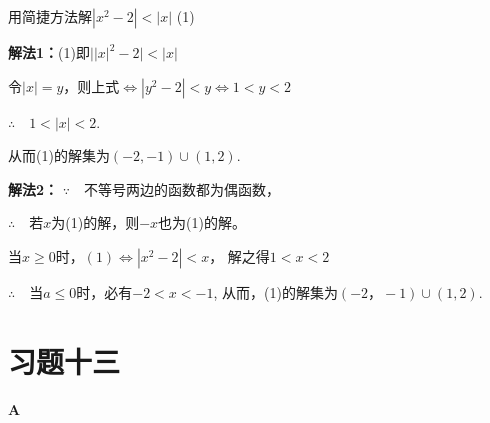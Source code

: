 \begin{example}
    用简捷方法解$|x^2-2|<|x|$ \hfill (1)
\end{example}

\begin{solution}
\textbf{解法1：}(1)即$\Big||x|^2-2\Big|<|x|$

令$|x|=y$，则上式$\Longleftrightarrow |y^2-2|<y\Longleftrightarrow 1<y<2$

$\therefore\quad 1<|x|<2$.

从而(1)的解集为$(-2,-1)\cup (1,2)$.

\textbf{解法2：} $\because\quad $不等号两边的函数都为偶函数，

$\therefore\quad $若$x$为(1)的解，则$-x$也为(1)的解。

当$x\ge 0$时，$(1)\Longleftrightarrow |x^2-2|<x$，
解之得$1<x<2$

$\therefore\quad $当$a\le 0$时，必有$-2<x<-1$, 
从而，(1)的解集为$(-2，-1)\cup (1,2)$.
\end{solution}

\section*{习题十三}
\begin{center}
    \bfseries A
\end{center}

